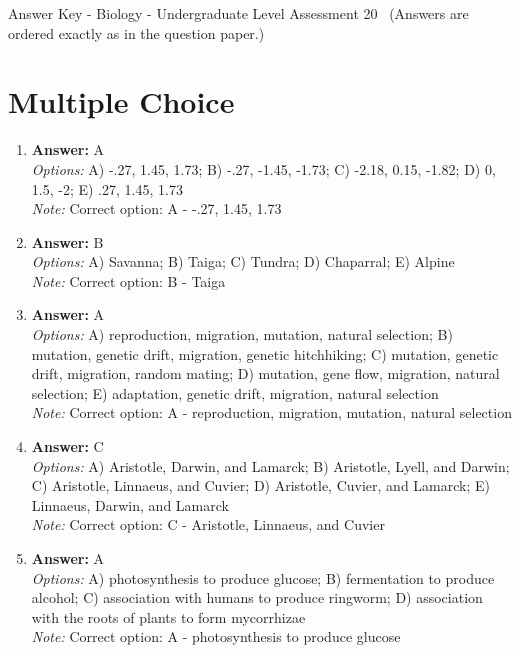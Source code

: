 \documentclass[12pt]{article}
\begin{document}
\begin{center}
Answer Key - Biology - Undergraduate Level Assessment 20 \
\small (Answers are ordered exactly as in the question paper.)
\end{center}

\section*{Multiple Choice}
\begin{enumerate}[label=\arabic*.]
\item \textbf{Answer:} A
\\ \textit{Options:} A) -.27, 1.45, 1.73; B) -.27, -1.45, -1.73; C) -2.18, 0.15, -1.82; D) 0, 1.5, -2; E) .27, 1.45, 1.73
\\ \textit{Note:} Correct option: A - -.27, 1.45, 1.73
\item \textbf{Answer:} B
\\ \textit{Options:} A) Savanna; B) Taiga; C) Tundra; D) Chaparral; E) Alpine
\\ \textit{Note:} Correct option: B - Taiga
\item \textbf{Answer:} A
\\ \textit{Options:} A) reproduction, migration, mutation, natural selection; B) mutation, genetic drift, migration, genetic hitchhiking; C) mutation, genetic drift, migration, random mating; D) mutation, gene flow, migration, natural selection; E) adaptation, genetic drift, migration, natural selection
\\ \textit{Note:} Correct option: A - reproduction, migration, mutation, natural selection
\item \textbf{Answer:} C
\\ \textit{Options:} A) Aristotle, Darwin, and Lamarck; B) Aristotle, Lyell, and Darwin; C) Aristotle, Linnaeus, and Cuvier; D) Aristotle, Cuvier, and Lamarck; E) Linnaeus, Darwin, and Lamarck
\\ \textit{Note:} Correct option: C - Aristotle, Linnaeus, and Cuvier
\item \textbf{Answer:} A
\\ \textit{Options:} A) photosynthesis to produce glucose; B) fermentation to produce alcohol; C) association with humans to produce ringworm; D) association with the roots of plants to form mycorrhizae
\\ \textit{Note:} Correct option: A - photosynthesis to produce glucose
\end{enumerate}
\end{document}

